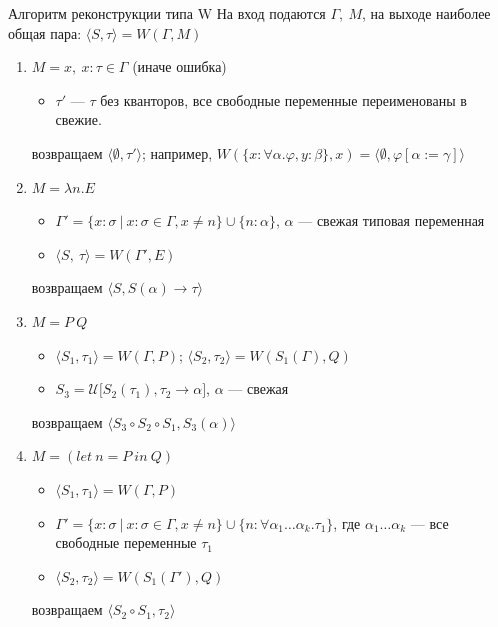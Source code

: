 \documentclass[aspectratio=169]{beamer}
\begin{document}
\begin{frame}{Алгоритм реконструкции типа W}
На вход подаются $\Gamma,\ M$, на выходе наиболее общая пара: $\langle S, \tau \rangle = W(\Gamma,M)$
\begin{enumerate}
    \item $M = x ,\ x:\tau  \in \Gamma$ (иначе ошибка)
    \begin{itemize}
        \item $\tau'$ --- $\tau$ без кванторов, все свободные переменные переименованы в свежие.
    \end{itemize}
    возвращаем $\langle\emptyset, \tau'\rangle$; например, $W(\{x:\forall \alpha.\varphi, y:\beta\}, x) = \langle\emptyset,\varphi[\alpha:=\gamma]\rangle$
    \item $M = \lambda n.E$
    \begin{itemize}
        \item $\Gamma' = \{x : \sigma\ |\ x:\sigma \in \Gamma, x \ne n\} \cup \{n : \alpha\}$, $\alpha$ --- свежая типовая переменная
        \item $\langle S,\ \tau \rangle = W(\Gamma', E)$
    \end{itemize}
    возвращаем $\langle S, S(\alpha) \rightarrow \tau\rangle$
    \item $M = P\ Q$
    \begin{itemize}
        \item $\langle S_1, \tau_1 \rangle = W(\Gamma, P)$; $\langle S_2, \tau_2 \rangle = W(S_1(\Gamma), Q)$
        \item $S_3 = \mathcal{U}\big[S_2(\tau_1), \tau_2 \rightarrow \alpha\big]$, $\alpha$ --- свежая
    \end{itemize}
    возвращаем $\langle S_3 \circ S_2 \circ S_1, S_3(\alpha) \rangle$
    \item $M = (let\ n = P\ in\ Q)$
    \begin{itemize}
        \item $\langle S_1, \tau_1\rangle = W(\Gamma, P)$
        \item $\Gamma' = \{x:\sigma\ |\ x:\sigma\in\Gamma,x \ne n\} \cup \{ n : \forall \alpha_1 \dots \alpha_k. \tau_1 \}$, где $\alpha_1 \dots \alpha_k$ --- все свободные переменные $\tau_1$
        \item $\langle S_2, \tau_2\rangle = W(S_1(\Gamma'), Q)$
    \end{itemize}
    возвращаем $\langle S_2 \circ S_1, \tau_2 \rangle$
\end{enumerate}
\end{frame}
\end{document}
